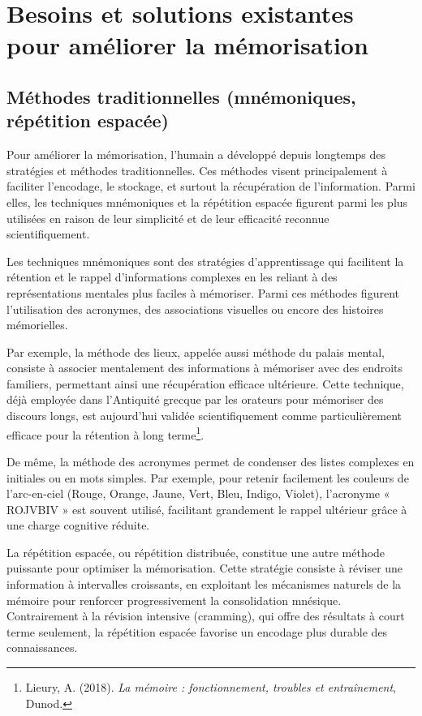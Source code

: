 \documentclass[12pt,a4paper]{report}
\begin{document}
\section{Besoins et solutions existantes pour améliorer la mémorisation}

\subsection{Méthodes traditionnelles (mnémoniques, répétition espacée)}

Pour améliorer la mémorisation, l’humain a développé depuis longtemps des stratégies et méthodes traditionnelles. Ces méthodes visent principalement à faciliter l’encodage, le stockage, et surtout la récupération de l’information. Parmi elles, les techniques mnémoniques et la répétition espacée figurent parmi les plus utilisées en raison de leur simplicité et de leur efficacité reconnue scientifiquement.

Les techniques mnémoniques sont des stratégies d'apprentissage qui facilitent la rétention et le rappel d'informations complexes en les reliant à des représentations mentales plus faciles à mémoriser. Parmi ces méthodes figurent l'utilisation des acronymes, des associations visuelles ou encore des histoires mémorielles.

Par exemple, la méthode des lieux, appelée aussi méthode du palais mental, consiste à associer mentalement des informations à mémoriser avec des endroits familiers, permettant ainsi une récupération efficace ultérieure. Cette technique, déjà employée dans l’Antiquité grecque par les orateurs pour mémoriser des discours longs, est aujourd’hui validée scientifiquement comme particulièrement efficace pour la rétention à long terme\footnote{Lieury, A. (2018). \textit{La mémoire : fonctionnement, troubles et entraînement}, Dunod.}.

De même, la méthode des acronymes permet de condenser des listes complexes en initiales ou en mots simples. Par exemple, pour retenir facilement les couleurs de l’arc-en-ciel (Rouge, Orange, Jaune, Vert, Bleu, Indigo, Violet), l'acronyme « ROJVBIV » est souvent utilisé, facilitant grandement le rappel ultérieur grâce à une charge cognitive réduite.

La répétition espacée, ou répétition distribuée, constitue une autre méthode puissante pour optimiser la mémorisation. Cette stratégie consiste à réviser une information à intervalles croissants, en exploitant les mécanismes naturels de la mémoire pour renforcer progressivement la consolidation mnésique. Contrairement à la révision intensive (cramming), qui offre des résultats à court terme seulement, la répétition espacée favorise un encodage plus durable des connaissances.
\end{document}
